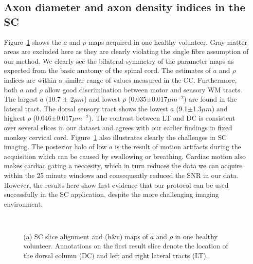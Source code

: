 \subsection*{Axon diameter and axon density indices in the SC}
Figure~\ref{fig:chap 9 SC results} shows the $a$ and $\rho$ maps acquired in one healthy volunteer. Gray matter areas are excluded here as they are clearly violating the single fibre assumption of our method.  We clearly see the bilateral symmetry of the parameter maps as expected from the basic anatomy of the spinal cord. The estimates of $a$ and $\rho$ indices are within a similar range of values measured in the \gls{CC}. Furthermore, both $a$ and $\rho$ allow good discrimination between motor and sensory WM tracts. The largest $a$ (10.7 $\pm$ 2$\mu m$) and lowest $\rho$ (0.035$\pm$0.017$\mu m^{-2}$) are found in the lateral tract. The dorsal sensory tract shows the lowest $a$ (9.1$\pm$1.3$\mu m$) and highest $\rho$ (0.046$\pm$0.017$\mu m^{-2}$). The contrast between LT and DC is consistent over several slices in our dataset and agrees with our earlier findings in fixed monkey cervical cord. Figure~\ref{fig:chap 9 SC results} also illustrates clearly the challenges in SC imaging. The posterior halo of low $a$ is the result of motion artifacts during the acquisition which can be caused by swallowing or breathing. Cardiac motion also makes cardiac gating a neccesity, which in turn reduces the data we can acquire within the 25 minute windows and consequently reduced the \gls{SNR} in our data. However, the results here show first evidence that our \SFasym{} protocol can be used successfully in the SC application, despite the more challenging imaging environment.
\begin{figure}[ht]
	\centering
	\begin{minipage}{0.39\textwidth}
	\end{minipage}
	\begin{minipage}{0.59\textwidth}
			\\
	\end{minipage}
	\caption{(a) SC slice alignment  and  (b\&c) maps of $a$ and $\rho$ in one healthy volunteer. Annotations on the first result slice denote the location of the dorsal column (DC) and left and right lateral tracts (LT).}
	\label{fig:chap 9 SC results}
\end{figure}


